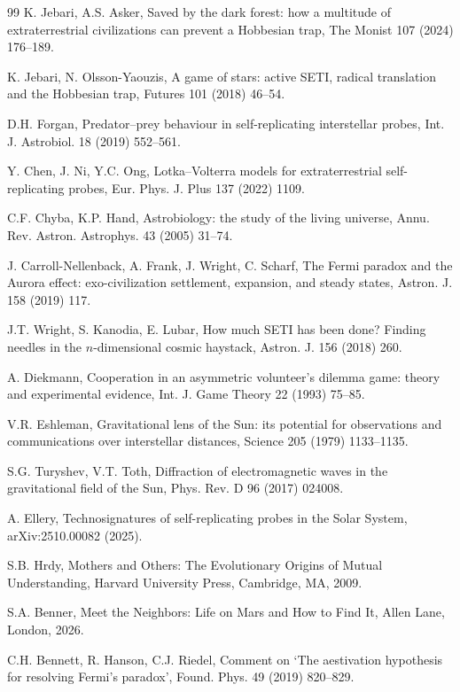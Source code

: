\documentclass[preprint,12pt]{elsarticle}
\theoremstyle{definition}
\begin{document}
\begin{thebibliography}{99}
 K. Jebari, A.S. Asker, Saved by the dark forest: how a multitude of extraterrestrial civilizations can prevent a Hobbesian trap, The Monist 107 (2024) 176--189.

 K. Jebari, N. Olsson-Yaouzis, A game of stars: active SETI, radical translation and the Hobbesian trap, Futures 101 (2018) 46--54.

 D.H. Forgan, Predator--prey behaviour in self-replicating interstellar probes, Int. J. Astrobiol. 18 (2019) 552--561.

 Y. Chen, J. Ni, Y.C. Ong, Lotka--Volterra models for extraterrestrial self-replicating probes, Eur. Phys. J. Plus 137 (2022) 1109.

 C.F. Chyba, K.P. Hand, Astrobiology: the study of the living universe, Annu. Rev. Astron. Astrophys. 43 (2005) 31--74.

 J. Carroll-Nellenback, A. Frank, J. Wright, C. Scharf, The Fermi paradox and the Aurora effect: exo-civilization settlement, expansion, and steady states, Astron. J. 158 (2019) 117.

 J.T. Wright, S. Kanodia, E. Lubar, How much SETI has been done? Finding needles in the $n$-dimensional cosmic haystack, Astron. J. 156 (2018) 260.

 A. Diekmann, Cooperation in an asymmetric volunteer's dilemma game: theory and experimental evidence, Int. J. Game Theory 22 (1993) 75--85.

 V.R. Eshleman, Gravitational lens of the Sun: its potential for observations and communications over interstellar distances, Science 205 (1979) 1133--1135.

 S.G. Turyshev, V.T. Toth, Diffraction of electromagnetic waves in the gravitational field of the Sun, Phys. Rev. D 96 (2017) 024008.

 A. Ellery, Technosignatures of self-replicating probes in the Solar System, arXiv:2510.00082 (2025).

 S.B. Hrdy, Mothers and Others: The Evolutionary Origins of Mutual Understanding, Harvard University Press, Cambridge, MA, 2009.

 S.A. Benner, Meet the Neighbors: Life on Mars and How to Find It, Allen Lane, London, 2026.

 C.H. Bennett, R. Hanson, C.J. Riedel, Comment on `The aestivation hypothesis for resolving Fermi's paradox', Found. Phys. 49 (2019) 820--829.


\end{thebibliography}
\end{document}
